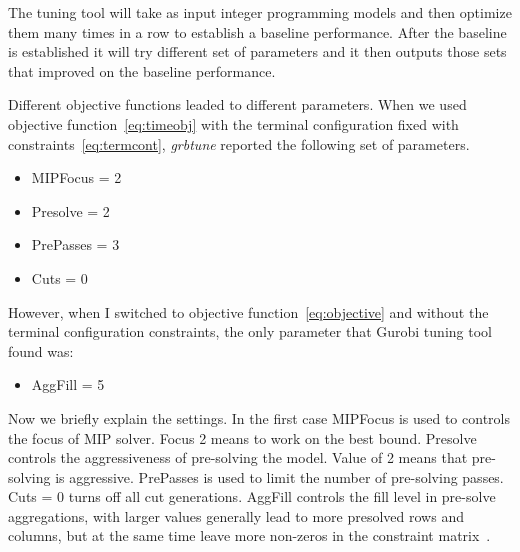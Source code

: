 The tuning tool will take as input integer programming models and then optimize
them many times in a row to establish a baseline performance. After the
baseline is established it will try different set of parameters and it then
outputs those sets that improved on the baseline performance.

Different objective functions leaded to different parameters. When we used
objective function~\eqref{eq:timeobj} with the terminal configuration fixed
with constraints~\eqref{eq:termcont}, \textit{grbtune} reported the following
set of parameters.
\begin{itemize}
    \item MIPFocus = 2
    \item Presolve = 2
    \item PrePasses = 3
    \item Cuts = 0
\end{itemize}

However, when I switched to objective function~\eqref{eq:objective} and
without the terminal configuration constraints, the only parameter that Gurobi
tuning tool found was:
\begin{itemize}
    \item AggFill = 5
\end{itemize}

Now we briefly explain the settings. In the first case MIPFocus is used to
controls the focus of MIP solver. Focus 2 means to work on the best bound.
Presolve controls the aggressiveness of pre-solving the model. Value of 2 means
that pre-solving is aggressive. PrePasses is used to limit the number of
pre-solving passes. Cuts = 0 turns off all cut generations. AggFill controls
the fill level in pre-solve aggregations, with larger values generally lead to
more presolved rows and columns, but at the same time leave more non-zeros in
the constraint matrix~\cite{gurobiparams}.

